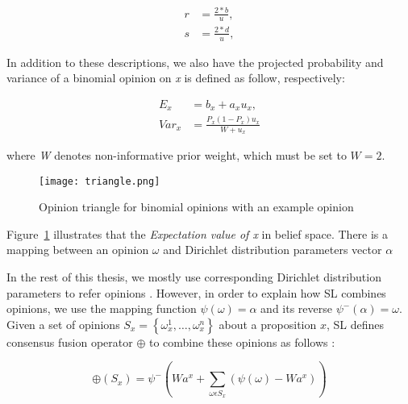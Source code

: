 \documentclass[a4,12pt]{ozu-thesis}
\begin{document}
\begin{subequations}
\label{eq:optim}
\begin{align}
    r &= \frac{2*b}{u},   \label{eq:cost}\\
   s &= \frac{2*d}{u} , \label{eq:const1}
\end{align}
\end{subequations}

In addition to these descriptions, we also have the projected probability and variance of a binomial opinion on \textit{x} is defined as follow, respectively:


\begin{align}
   E_{x} &= b_{x} + a_{x}u_{x}, \\
   Var_{x} &= \frac{P_{x}\left ( 1-P_{x} \right )u_{x}}{W+u_{x}}
\end{align}

where \textit{W} denotes non-informative prior weight, which must be set to $W = 2$.


\begin{figure}[h]
\begin{center}
\texttt{[image: triangle.png]}
\end{center}
\caption{Opinion triangle for binomial opinions with an example opinion \cite{josang2011subjective}}
\label{fig:triangle}
\end{figure}


Figure~\ref{fig:triangle} illustrates that the \textit{Expectation value of x} in belief space. There is a mapping between an opinion $\omega$ and Dirichlet distribution parameters vector $\alpha$


In the rest of this thesis, we mostly use corresponding Dirichlet distribution parameters to refer opinions \cite{sensoy2015fuse}. However, in order to explain how SL combines opinions, we use the mapping function $\psi \left ( \omega  \right ) = \alpha$ and its reverse $\psi^{-} \left ( \alpha  \right ) = \omega$. Given a set of opinions $S_{x} = \left \{ \omega _{x}^{1},\ldots, \omega _{x}^{n}  \right \}$ about a proposition $x$, SL defines consensus fusion operator $\oplus $ to combine these opinions as follows \cite{josang2002consensus}:

\begin{equation}
\oplus \left ( S_{x} \right ) = \psi ^{-}\left ( Wa^{x} + \sum_{\omega \epsilon S_{x}}\left ( \psi \left ( \omega  \right ) - Wa^{x}\right ) \right )
\end{equation}
  
\end{document}
